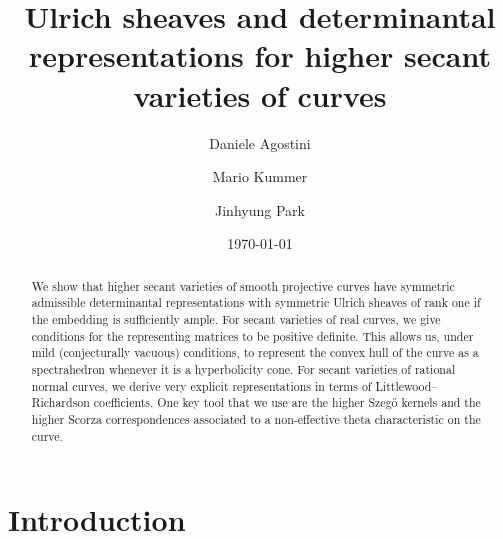 \documentclass[12pt]{amsart}
\newcounter{conj}
\numberwithin{equation}{section}
\numberwithin{thmcounter}{section}
\theoremstyle{definition}
\theoremstyle{claim}
\begin{document}
\title[Ulrich sheaves for higher secant varieties of curves]{Ulrich sheaves and determinantal representations for higher secant varieties of curves}

\author{Daniele Agostini}
\address{Department of Mathematics, Eberhard Karls Universit\"{a}t T\"{u}bingen, Germany}


\author{Mario Kummer}
\address{Faculty of Mathematics, Technische Universit\"{a}t Dresden, Germany}


\author{Jinhyung Park}
\address{Department of Mathematical Sciences, KAIST, Daejeon, Republic of Korea}

\date{\today}

\begin{abstract}
We show that higher secant varieties of smooth projective curves have symmetric admissible determinantal representations with symmetric Ulrich sheaves of rank one if the embedding is sufficiently ample. 
For secant varieties of real curves, we give conditions for the representing matrices to be positive definite. This allows us, under mild (conjecturally vacuous) conditions, to represent the convex hull of the curve as a spectrahedron whenever it is a hyperbolicity cone.
For secant varieties of rational normal curves, we derive very explicit representations in terms of Littlewood--Richardson coefficients.
One key tool that we use are the higher Szeg\H{o} kernels and the higher Scorza correspondences associated to a non-effective theta characteristic on the curve.
\end{abstract}

\maketitle



\section{Introduction}
\end{document}
